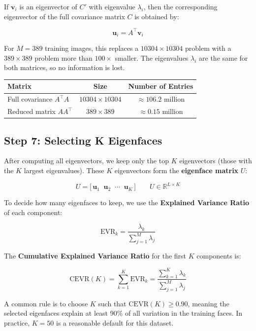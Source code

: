 \documentclass[12pt,a4paper]{article}
\begin{document}
If $\mathbf{v}_i$ is an eigenvector of $C'$ with eigenvalue $\lambda_i$, then the
corresponding eigenvector of the full covariance matrix $C$ is obtained by:

\[
\mathbf{u}_i = A^\top \mathbf{v}_i
\]

For $M = 389$ training images, this replaces a $10304 \times 10304$ problem with a
$389 \times 389$ problem more than $100 \times$ smaller. The eigenvalues
$\lambda_i$ are the same for both matrices, so no information is lost.

\begin{center}
\begin{tabular}{lcc}
\toprule
\textbf{Matrix} & \textbf{Size} & \textbf{Number of Entries} \\
\midrule
Full covariance $A^\top A$   & $10304 \times 10304$ & $\approx 106.2$ million \\
Reduced matrix $A A^\top$    & $389 \times 389$     & $\approx 0.15$ million \\
\bottomrule
\end{tabular}
\end{center}

\subsection{Step 7: Selecting K Eigenfaces}

After computing all eigenvectors, we keep only the top $K$ eigenvectors
(those with the $K$ largest eigenvalues). These $K$ eigenvectors form the
\textbf{eigenface matrix} $U$:

\[
U = \bigl[\,\mathbf{u}_1 \;\; \mathbf{u}_2 \;\; \cdots \;\; \mathbf{u}_K\,\bigr]
\qquad U \in \mathbb{R}^{L \times K}
\]

To decide how many eigenfaces to keep, we use the \textbf{Explained Variance Ratio}
of each component:

\[
\text{EVR}_k = \frac{\lambda_k}{\displaystyle\sum_{j=1}^{M} \lambda_j}
\]

The \textbf{Cumulative Explained Variance Ratio} for the first $K$ components is:

\[
\text{CEVR}(K) = \sum_{k=1}^{K} \text{EVR}_k = \frac{\displaystyle\sum_{k=1}^{K} \lambda_k}{\displaystyle\sum_{j=1}^{M} \lambda_j}
\]

A common rule is to choose $K$ such that $\text{CEVR}(K) \geq 0.90$, meaning
the selected eigenfaces explain at least 90\% of all variation in the training
faces. In practice, $K = 50$ is a reasonable default for this dataset.
\end{document}
